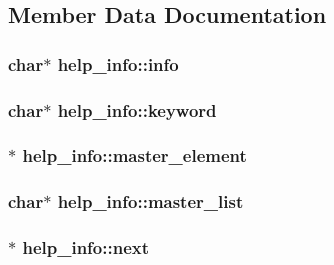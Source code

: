 \subsection{Member Data Documentation}
\hypertarget{structhelp__info_a7e6e76d90ae4aeb1db48cee1eeee33d8}{
\subsubsection[{info}]{\setlength{\rightskip}{0pt plus 5cm}char$\ast$ help\-\_\-info\-::info}}\label{structhelp__info_a7e6e76d90ae4aeb1db48cee1eeee33d8}
\hypertarget{structhelp__info_aac7c41b14f94f94c61268c91cbcad522}{
\subsubsection[{keyword}]{\setlength{\rightskip}{0pt plus 5cm}char$\ast$ help\-\_\-info\-::keyword}}\label{structhelp__info_aac7c41b14f94f94c61268c91cbcad522}
\hypertarget{structhelp__info_af7c2d49f46dddf86d147fb73571e143f}{
\subsubsection[{master\-\_\-element}]{$\ast$ help\-\_\-info\-::master\-\_\-element}}\label{structhelp__info_af7c2d49f46dddf86d147fb73571e143f}
\hypertarget{structhelp__info_af15d68887c64a3989b2a97c39e592099}{
\subsubsection[{master\-\_\-list}]{\setlength{\rightskip}{0pt plus 5cm}char$\ast$ help\-\_\-info\-::master\-\_\-list}}\label{structhelp__info_af15d68887c64a3989b2a97c39e592099}
\hypertarget{structhelp__info_a9151e388d483f9dfa356c5e3f9f9a714}{
\subsubsection[{next}]{$\ast$ help\-\_\-info\-::next}}\label{structhelp__info_a9151e388d483f9dfa356c5e3f9f9a714}
